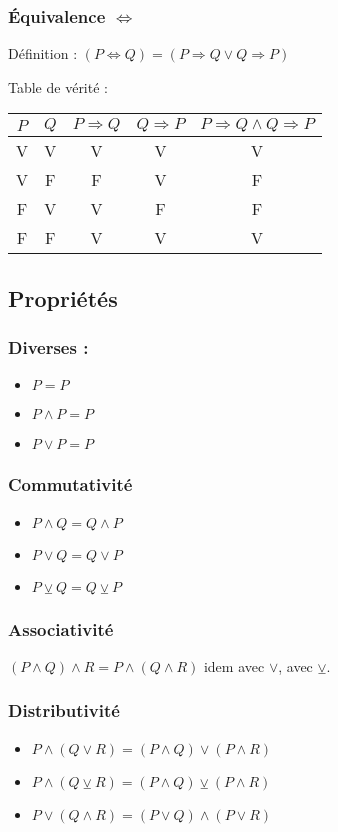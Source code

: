 \documentclass[12pt,a4paper,french]{book}
\begin{document}
\subsubsection{Équivalence $\Leftrightarrow$}
Définition : $\left( P \Leftrightarrow Q \right)  = \left( P \Rightarrow Q \vee Q \Rightarrow P \right)$

Table de vérité :
\begin{center}
	\begin{tabular}{ |c||c||c||c||c| }
		\hline
		$P$ & $Q$ & $ P \Rightarrow Q$ & $Q \Rightarrow P$ & $ P \Rightarrow Q \wedge Q \Rightarrow P$ \\
		\hline
		V&V&V&V&V\\
		V&F&F&V&F\\
		F&V&V&F&F\\
		F&F&V&V&V\\
		\hline
	\end{tabular}
\end{center}

\subsection{Propriétés}
\subsubsection{Diverses :}
\begin{itemize}
	\item \textlnot\textlnot$P = P$
	\item $P \wedge P = P$
	\item $P \vee P = P$
\end{itemize}
\subsubsection{Commutativité}
\begin{itemize}
	\item $P \wedge Q = Q \wedge P$
	\item $P \vee Q = Q \vee P$
	\item $P \veebar Q = Q \veebar P$
\end{itemize}
\subsubsection{Associativité}
$\left( P \wedge Q \right) \wedge R = P \wedge \left( Q \wedge R \right)$
idem avec $\vee$, avec $\veebar$.
\subsubsection{Distributivité}
\begin{itemize}
\item $P \wedge \left( Q \vee R \right) = (P \wedge Q) \vee (P \wedge R)$
\item $P \wedge (Q \veebar R) = (P \wedge Q) \veebar (P \wedge R)$
\item $P \vee (Q \wedge R) = (P \vee Q) \wedge (P \vee R)$
\end{itemize}
\end{document}
